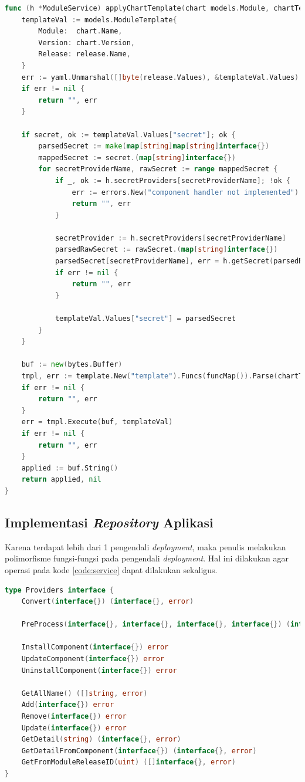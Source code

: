 \begin{lstlisting}[frame=single,language=Go,caption={Fungsi \textit{Template} dan Vault},label={code:template}]
func (h *ModuleService) applyChartTemplate(chart models.Module, chartTemplate string, release models.ModuleRelease) (string, error) {
	templateVal := models.ModuleTemplate{
		Module:  chart.Name,
		Version: chart.Version,
		Release: release.Name,
	}
	err := yaml.Unmarshal([]byte(release.Values), &templateVal.Values)
	if err != nil {
		return "", err
	}

	if secret, ok := templateVal.Values["secret"]; ok {
		parsedSecret := make(map[string]map[string]interface{})
		mappedSecret := secret.(map[string]interface{})
		for secretProviderName, rawSecret := range mappedSecret {
			if _, ok := h.secretProviders[secretProviderName]; !ok {
				err := errors.New("component handler not implemented")
				return "", err
			}

			secretProvider := h.secretProviders[secretProviderName]
			parsedRawSecret := rawSecret.(map[string]interface{})
			parsedSecret[secretProviderName], err = h.getSecret(parsedRawSecret, secretProvider)
			if err != nil {
				return "", err
			}

			templateVal.Values["secret"] = parsedSecret
		}
	}

	buf := new(bytes.Buffer)
	tmpl, err := template.New("template").Funcs(funcMap()).Parse(chartTemplate)
	if err != nil {
		return "", err
	}
	err = tmpl.Execute(buf, templateVal)
	if err != nil {
		return "", err
	}
	applied := buf.String()
	return applied, nil
}
\end{lstlisting}

\subsection{Implementasi \textit{Repository} Aplikasi}
\label{sec:repositoryImpl}
Karena terdapat lebih dari 1 pengendali \textit{deployment}, maka penulis melakukan polimorfisme fungsi-fungsi pada pengendali \textit{deployment}. Hal ini dilakukan agar operasi pada kode \ref{code:service} dapat dilakukan sekaligus.
\begin{lstlisting}[frame=single,language=Go,caption={Providers \textit{Interface}},label={code:providerInterface}]
type Providers interface {
	Convert(interface{}) (interface{}, error)

	PreProcess(interface{}, interface{}, interface{}, interface{}) (interface{}, error)

	InstallComponent(interface{}) error
	UpdateComponent(interface{}) error
	UninstallComponent(interface{}) error

	GetAllName() ([]string, error)
	Add(interface{}) error
	Remove(interface{}) error
	Update(interface{}) error
	GetDetail(string) (interface{}, error)
	GetDetailFromComponent(interface{}) (interface{}, error)
	GetFromModuleReleaseID(uint) ([]interface{}, error)
}
\end{lstlisting}

